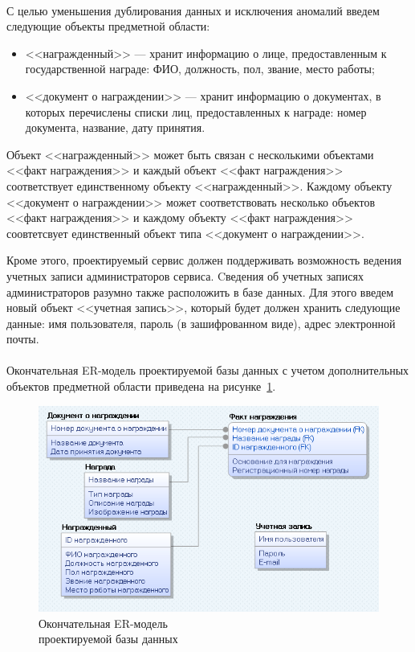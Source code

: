 \paragraph{}
С целью уменьшения дублирования данных и исключения аномалий введем
следующие объекты предметной области:

\begin{itemize}
\item <<награжденный>> --- хранит информацию о лице, предоставленным
  к государственной награде: ФИО, должность, пол, звание, место работы;
\item <<документ о награждении>> --- хранит информацию о документах,
  в которых перечислены списки лиц, предоставленных к награде: номер документа,
  название, дату принятия.
\end{itemize}

Объект <<награжденный>> может быть связан с несколькими
объектами <<факт награждения>> и каждый объект <<факт награждения>> 
соответствует единственному объекту <<награжденный>>.
Каждому объекту <<документ о награждении>> может соответствовать несколько
объектов <<факт награждения>> и каждому объекту <<факт награждения>> 
соовтетсвует единственный объект типа <<документ о награждении>>.

Кроме этого, проектируемый сервис должен поддерживать возможность ведения
учетных записи администраторов сервиса.
Cведения об учетных записях администраторов разумно также
расположить в базе данных. Для этого введем новый объект <<учетная запись>>,
который будет должен хранить следующие данные:
имя пользователя, пароль (в зашифрованном виде), адрес электронной почты.

\pagebreak
\paragraph{}
Окончательная ER-модель проектируемой базы данных с учетом
дополнительных объектов предметной области приведена
на рисунке~\ref{fig:er_final}.

\begin{figure}[h]
  \centering
  \includegraphics[width=150mm]{pic/er_final.png}
  \caption{Окончательная ER-модель \\ проектируемой базы данных}
  \label{fig:er_final}
\end{figure}

